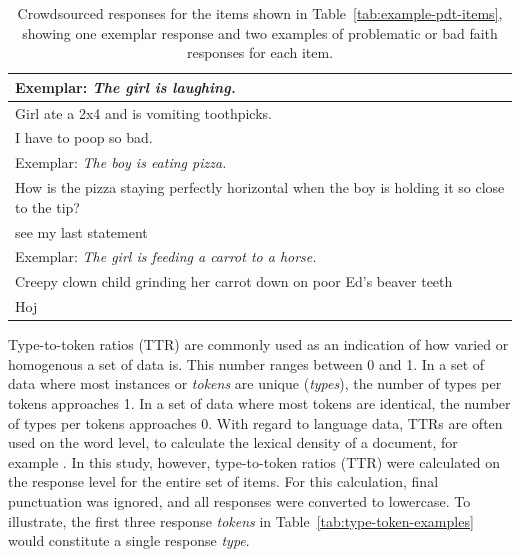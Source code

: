 \begin{table}[htb!]
\begin{center}
\begin{tabular}{|l|}
\hline
Exemplar: \textit{The girl is laughing.} \\
\hline
Girl ate a 2x4 and is vomiting toothpicks. \\
\hline
I have to poop so bad. \\
\hline
\hline
Exemplar: \textit{The boy is eating pizza.} \\
\hline
How is the pizza staying perfectly horizontal when the boy is holding it so close to the tip? \\
\hline
see my last statement \\
\hline
\hline
Exemplar: \textit{The girl is feeding a carrot to a horse.} \\
\hline
Creepy clown child grinding her carrot down on poor Ed's beaver teeth \\
\hline
Hoj \\
\hline
\end{tabular}
\caption{\label{tab:bad-faith} Crowdsourced responses for the items shown in Table~\ref{tab:example-pdt-items}, showing one exemplar response and two examples of problematic or bad faith responses for each item.}
\end{center}
\end{table}


Type-to-token ratios (TTR) are commonly used as an indication of how varied or homogenous a set of data is. This number ranges between 0 and 1. In a set of data where most instances or \textit{tokens} are unique (\textit{types}), the number of types per tokens approaches 1. In a set of data where most tokens are identical, the number of types per tokens approaches 0. With regard to language data, TTRs are often used on the word level, to calculate the lexical density of a document, for example \citep{granger2002computer}. In this study, however, type-to-token ratios (TTR) were calculated on the response level for the entire set of items. For this calculation, final punctuation was ignored, and all responses were converted to lowercase. To illustrate, the first three response \textit{tokens} in Table~\ref{tab:type-token-examples} would constitute a single response \textit{type}.

